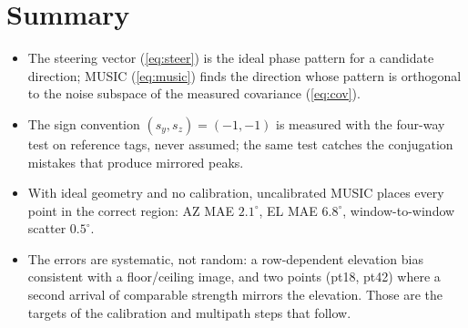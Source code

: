 \documentclass[11pt,a4paper]{article}
\begin{document}
\section{Summary}
\begin{itemize}
  \item The steering vector (\ref{eq:steer}) is the ideal phase pattern for a candidate direction; MUSIC (\ref{eq:music}) finds the direction whose pattern is orthogonal to the noise subspace of the measured covariance (\ref{eq:cov}).
  \item The sign convention $(s_y, s_z) = (-1, -1)$ is measured with the four-way test on reference tags, never assumed; the same test catches the conjugation mistakes that produce mirrored peaks.
  \item With ideal geometry and no calibration, uncalibrated MUSIC places every point in the correct region: AZ MAE $2.1^\circ$, EL MAE $6.8^\circ$, window-to-window scatter $0.5^\circ$.
  \item The errors are systematic, not random: a row-dependent elevation bias consistent with a floor/ceiling image, and two points (pt18, pt42) where a second arrival of comparable strength mirrors the elevation. Those are the targets of the calibration and multipath steps that follow.
\end{itemize}
\end{document}

